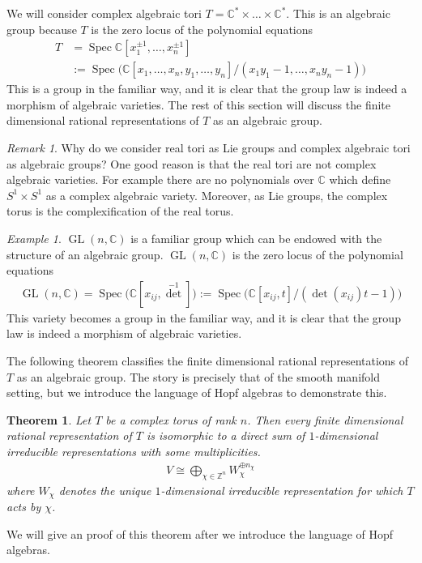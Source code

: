 \documentclass[manuscript, printscheme]{aomart}
\theoremstyle{plain} %
\newtheorem{theorem}[equation]{Theorem}
\theoremstyle{definition}
\theoremstyle{remark}
\newtheorem{remark}[equation]{Remark}
\newtheorem{example}[equation]{Example}
\DeclareMathOperator{\GL}{GL}
\newcommand{\C}{\mathbb{C}}
\newcommand{\Z}{\mathbb{Z}}
\DeclareMathOperator{\Spec}{Spec}
\newcommand{\inv}[1]{{#1}^{-1}}
\begin{document}
We will consider complex algebraic tori $T = \C^* \times \dots \times \C^*$.
This is an algebraic group because $T$ is the zero locus of
the polynomial equations \begin{align*}
	T &= \Spec \C[x_1^{\pm 1},\ldots, x_n^{\pm 1}] \\
	&:= \Spec\big(\C[x_1,\dots,x_n,y_1,\dots,y_n]/(x_1y_1-1,\dots,x_ny_n-1)\big)
\end{align*} This is a group in the familiar way,
and it is clear that the group law is indeed a morphism of algebraic varieties. The rest of this section will discuss
the finite dimensional rational representations of $T$ as an algebraic group.

\begin{remark}
	Why do we consider real tori as Lie groups and complex algebraic tori as algebraic groups? One good reason is that the real tori 
	are not complex algebraic varieties. For example there are no polynomials over $\C$ which define $S^1\times S^1$ as a complex algebraic variety.
	Moreover, as Lie groups, the complex torus is the complexification of the real torus.
\end{remark}

\begin{example}
	$\GL(n,\C)$ is a familiar group which can be endowed with the structure of an algebraic group.
	$\GL(n,\C)$ is the zero locus of the polynomial equations
	\begin{align*}
		\GL(n,\C) = \Spec \big(\C[x_{ij},\inv{\det}]\big) := \Spec\big(\C[x_{ij},t]/(\det(x_{ij})t-1)\big)
	\end{align*} This variety becomes a group in the familiar way,
	and it is clear that the group law is indeed a morphism of algebraic varieties.
\end{example}

The following theorem classifies
the finite dimensional rational representations of $T$ as an algebraic group.
The story is precisely that of the smooth manifold setting, but we introduce the language of Hopf algebras to demonstrate this.

\begin{theorem}\label{thm:ratrep}
	Let $T$ be a complex torus of rank $n$.
	Then every finite dimensional rational representation of $T$
	is isomorphic
	to a direct sum of $1$-dimensional irreducible representations with some multiplicities.
	\begin{align*}
		V \cong \bigoplus_{\chi\in \Z^n} W_\chi^{\oplus n_\chi}
	\end{align*} where $W_\chi$ denotes the unique $1$-dimensional irreducible representation for which $T$ acts by $\chi$.
\end{theorem}
We will give an proof of this theorem after we introduce the language of Hopf algebras.
\end{document}
